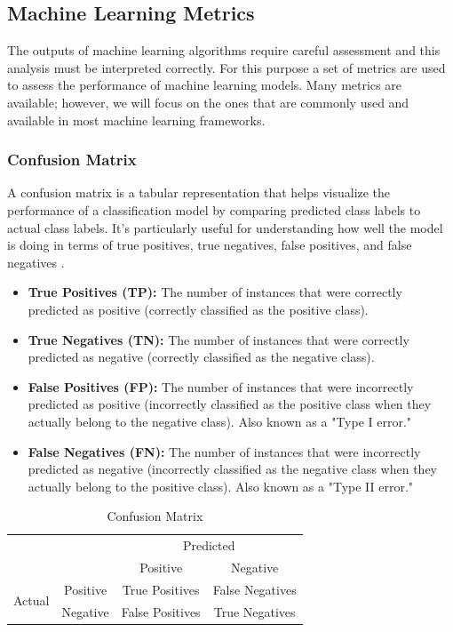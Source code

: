 \subsection{Machine Learning Metrics}
The outputs of machine learning algorithms require careful assessment and this analysis must be interpreted correctly. For this purpose a set of metrics are used to assess the performance of machine learning models. Many metrics are available; however, we will focus on the ones that are commonly used and available in most machine learning frameworks.

\subsubsection{Confusion Matrix}
A confusion matrix is a tabular representation that helps visualize the performance of a classification model by comparing predicted class labels to actual class labels. It's particularly useful for understanding how well the model is doing in terms of true positives, true negatives, false positives, and false negatives \citep{Tharwat2021}.


\begin{itemize}
  \item \textbf{True Positives (TP):} The number of instances that were correctly predicted as positive (correctly classified as the positive class).
  \item \textbf{True Negatives (TN):} The number of instances that were correctly predicted as negative (correctly classified as the negative class).
  \item \textbf{False Positives (FP):} The number of instances that were incorrectly predicted as positive (incorrectly classified as the positive class when they actually belong to the negative class). Also known as a "Type I error."
  \item \textbf{False Negatives (FN):} The number of instances that were incorrectly predicted as negative (incorrectly classified as the negative class when they actually belong to the positive class). Also known as a "Type II error."
\end{itemize}


\begin{table}[h]
\centering
\begin{tabular}{cc|c|c|}
\multicolumn{2}{c}{} & \multicolumn{2}{c}{Predicted} \\
\cline{3-4}
\multicolumn{2}{c|}{} & Positive & Negative \\
\cline{2-4}
\multirow{2}{*}{Actual} & Positive & True Positives & False Negatives \\
\cline{2-4}
& Negative & False Positives & True Negatives \\
\cline{2-4}
\end{tabular}
\caption{Confusion Matrix}
\end{table}

